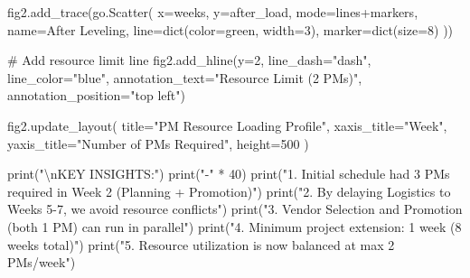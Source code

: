 \documentclass[
  letterpaper,
  DIV=11,
  numbers=noendperiod]{scrreprt}
\newenvironment{Shaded}{\begin{snugshade}}{\end{snugshade}}
\newcommand{\BuiltInTok}[1]{\textcolor[rgb]{0.00,0.23,0.31}{#1}}
\newcommand{\CharTok}[1]{\textcolor[rgb]{0.13,0.47,0.30}{#1}}
\newcommand{\CommentTok}[1]{\textcolor[rgb]{0.37,0.37,0.37}{#1}}
\newcommand{\DecValTok}[1]{\textcolor[rgb]{0.68,0.00,0.00}{#1}}
\newcommand{\NormalTok}[1]{\textcolor[rgb]{0.00,0.23,0.31}{#1}}
\newcommand{\OperatorTok}[1]{\textcolor[rgb]{0.37,0.37,0.37}{#1}}
\newcommand{\StringTok}[1]{\textcolor[rgb]{0.13,0.47,0.30}{#1}}
\begin{document}
\begin{Shaded}
\begin{Highlighting}[]
\NormalTok{    fig2.add\_trace(go.Scatter(}
\NormalTok{        x}\OperatorTok{=}\NormalTok{weeks, y}\OperatorTok{=}\NormalTok{after\_load,}
\NormalTok{        mode}\OperatorTok{=}\StringTok{\textquotesingle{}lines+markers\textquotesingle{}}\NormalTok{,}
\NormalTok{        name}\OperatorTok{=}\StringTok{\textquotesingle{}After Leveling\textquotesingle{}}\NormalTok{,}
\NormalTok{        line}\OperatorTok{=}\BuiltInTok{dict}\NormalTok{(color}\OperatorTok{=}\StringTok{\textquotesingle{}green\textquotesingle{}}\NormalTok{, width}\OperatorTok{=}\DecValTok{3}\NormalTok{),}
\NormalTok{        marker}\OperatorTok{=}\BuiltInTok{dict}\NormalTok{(size}\OperatorTok{=}\DecValTok{8}\NormalTok{)}
\NormalTok{    ))}
    
    \CommentTok{\# Add resource limit line}
\NormalTok{    fig2.add\_hline(y}\OperatorTok{=}\DecValTok{2}\NormalTok{, line\_dash}\OperatorTok{=}\StringTok{"dash"}\NormalTok{, line\_color}\OperatorTok{=}\StringTok{"blue"}\NormalTok{, }
\NormalTok{                  annotation\_text}\OperatorTok{=}\StringTok{"Resource Limit (2 PMs)"}\NormalTok{, }
\NormalTok{                  annotation\_position}\OperatorTok{=}\StringTok{"top left"}\NormalTok{)}
    
\NormalTok{    fig2.update\_layout(}
\NormalTok{        title}\OperatorTok{=}\StringTok{"PM Resource Loading Profile"}\NormalTok{,}
\NormalTok{        xaxis\_title}\OperatorTok{=}\StringTok{"Week"}\NormalTok{,}
\NormalTok{        yaxis\_title}\OperatorTok{=}\StringTok{"Number of PMs Required"}\NormalTok{,}
\NormalTok{        height}\OperatorTok{=}\DecValTok{500}
\NormalTok{    )}
    
    \BuiltInTok{print}\NormalTok{(}\StringTok{"}\CharTok{\textbackslash{}n}\StringTok{KEY INSIGHTS:"}\NormalTok{)}
    \BuiltInTok{print}\NormalTok{(}\StringTok{"{-}"} \OperatorTok{*} \DecValTok{40}\NormalTok{)}
    \BuiltInTok{print}\NormalTok{(}\StringTok{"1. Initial schedule had 3 PMs required in Week 2 (Planning + Promotion)"}\NormalTok{)}
    \BuiltInTok{print}\NormalTok{(}\StringTok{"2. By delaying \textquotesingle{}Logistics\textquotesingle{} to Weeks 5{-}7, we avoid resource conflicts"}\NormalTok{)}
    \BuiltInTok{print}\NormalTok{(}\StringTok{"3. \textquotesingle{}Vendor Selection\textquotesingle{} and \textquotesingle{}Promotion\textquotesingle{} (both 1 PM) can run in parallel"}\NormalTok{)}
    \BuiltInTok{print}\NormalTok{(}\StringTok{"4. Minimum project extension: 1 week (8 weeks total)"}\NormalTok{)}
    \BuiltInTok{print}\NormalTok{(}\StringTok{"5. Resource utilization is now balanced at max 2 PMs/week"}\NormalTok{)}
    

\end{Highlighting}
\end{Shaded}
\end{document}
